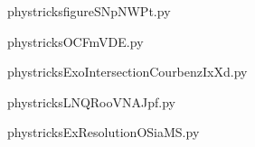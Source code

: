     

    \clearpage
    


    \newcommand{\CaptionFigfigureSNpNWPt}{<+Type your caption here+>}
    \begin{center}
        
    \end{center}
    phystricksfigureSNpNWPt.py

    

    \clearpage
    


    \newcommand{\CaptionFigOCFmVDE}{<+Type your caption here+>}
    \begin{center}
        
    \end{center}
    phystricksOCFmVDE.py

    

    \clearpage
    


    \newcommand{\CaptionFigExoIntersectionCourbenzIxXd}{<+Type your caption here+>}
    \begin{center}
        
    \end{center}
    phystricksExoIntersectionCourbenzIxXd.py

    

    \clearpage
    


    \newcommand{\CaptionFigLNQRooVNAJpf}{<+Type your caption here+>}
    \begin{center}
        
    \end{center}
    phystricksLNQRooVNAJpf.py

    

    \clearpage
    


    \newcommand{\CaptionFigExResolutionOSiaMS}{<+Type your caption here+>}
    \begin{center}
        
    \end{center}
    phystricksExResolutionOSiaMS.py

    

    \clearpage
    

